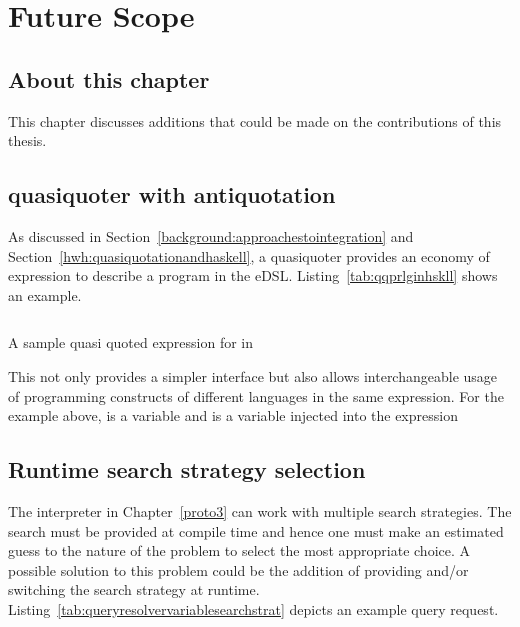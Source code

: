 \documentclass[thesis-solanki.tex]{subfiles}
\begin{document}
\chapter{Future Scope}\label{chap:futureScope}


\section{About this chapter}
This chapter discusses additions that could be made on the contributions of this thesis.


\section{ quasiquoter with antiquotation}
As discussed in Section~\ref{background:approachestointegration} and Section~\ref{hwh:quasiquotationandhaskell}, a
quasiquoter provides an economy of expression to describe a program in the eDSL.
Listing~\ref{tab:qqprlginhskll} shows an example.

\begin{code-list}[H]
\begin{singlespace}
\inputminted{haskell}{haskell-proto4-qq-prlg-in-hskll.hs}
\end{singlespace}
\caption{A sample quasi quoted expression for  in }
\label{tab:qqprlginhskll}
\end{code-list}

This not only provides a simpler interface but also allows interchangeable usage of programming constructs of
different languages in the same expression.
For the example above,  is a  variable and  is a
 variable injected into the expression

\section{Runtime search strategy selection}
The  interpreter in Chapter~\ref{proto3} can work with multiple search strategies.
The search must be provided at compile time and hence one must make an estimated guess to the nature of the problem
to select the most appropriate choice.
A possible solution to this problem could be the addition of providing and/or switching the search strategy at
runtime.
Listing~\ref{tab:queryresolvervariablesearchstrat} depicts an example query request.
\end{document}
